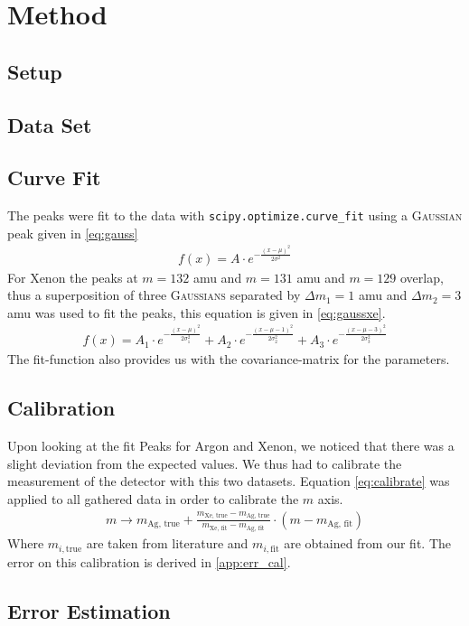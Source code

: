 \newpage
\section{Method} \label{sec:method}
\subsection{Setup}
\subsection{Data Set}
\subsection{Curve Fit}
\label{sec:fit}
The peaks were fit to the data with \texttt{scipy.optimize.curve\_fit}\cite{scipy} using a {\scshape Gaussian} peak given in \eqref{eq:gauss}
\begin{align}
    f(x) = A\cdot e^{-\frac{(x-\mu)^2}{2\sigma^2}} \label{eq:gauss}
\end{align}
For Xenon the peaks at $m=132$ amu and $m=131$ amu and $m=129$ overlap, thus a superposition of three {\scshape Gaussians} separated by $\Delta m_1 = 1$ amu and $\Delta m_2 = 3$ amu was used to fit the peaks, this equation is given in \eqref{eq:gaussxe}.
\begin{align}
    f(x) = A_1\cdot e^{-\frac{(x-\mu)^2}{2\sigma_1^2}} + A_2\cdot e^{-\frac{(x-\mu - 1)^2}{2\sigma_2^2}} + A_3\cdot e^{-\frac{(x-\mu-3)^2}{2\sigma_3^2}} \label{eq:gaussxe}
\end{align}
The fit-function also provides us with the covariance-matrix for the parameters.

\subsection{Calibration}
Upon looking at the fit Peaks for Argon and Xenon, we noticed that there was a slight deviation from the expected values. We thus had to calibrate the measurement of the detector with this two datasets. Equation \eqref{eq:calibrate} was applied to all gathered data in order to calibrate the $m$ axis.
\begin{align}
    m \to m_\text{Ag, true} + \frac{m_\text{Xe, true} - m_\text{Ag, true}}{m_\text{Xe, fit} - m_\text{Ag, fit}} \cdot (m - m_\text{Ag, fit}) \label{eq:calibrate}
\end{align}
Where $m_{i, \text{true}}$ are taken from literature and $m_{i, \text{fit}}$ are obtained from our fit.
The error on this calibration is derived in \ref{app:err_cal}.
\subsection{Error Estimation}


